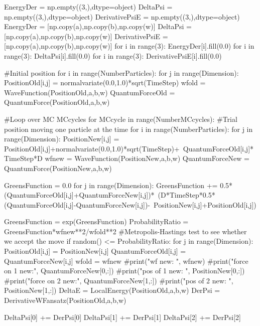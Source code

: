 \documentclass[%
oneside,                 %
final,                   %
10pt]{article}
\begin{document}
    EnergyDer = np.empty((3,),dtype=object)
    DeltaPsi = np.empty((3,),dtype=object)
    DerivativePsiE = np.empty((3,),dtype=object)
    EnergyDer = [np.copy(a),np.copy(b),np.copy(w)]
    DeltaPsi = [np.copy(a),np.copy(b),np.copy(w)]
    DerivativePsiE = [np.copy(a),np.copy(b),np.copy(w)]
    for i in range(3): EnergyDer[i].fill(0.0)
    for i in range(3): DeltaPsi[i].fill(0.0)
    for i in range(3): DerivativePsiE[i].fill(0.0)

    
    #Initial position
    for i in range(NumberParticles):
        for j in range(Dimension):
            PositionOld[i,j] = normalvariate(0.0,1.0)*sqrt(TimeStep)
    wfold = WaveFunction(PositionOld,a,b,w)
    QuantumForceOld = QuantumForce(PositionOld,a,b,w)

    #Loop over MC MCcycles
    for MCcycle in range(NumberMCcycles):
        #Trial position moving one particle at the time
        for i in range(NumberParticles):
            for j in range(Dimension):
                PositionNew[i,j] = PositionOld[i,j]+normalvariate(0.0,1.0)*sqrt(TimeStep)+\
                                       QuantumForceOld[i,j]*TimeStep*D
            wfnew = WaveFunction(PositionNew,a,b,w)
            QuantumForceNew = QuantumForce(PositionNew,a,b,w)
            
            GreensFunction = 0.0
            for j in range(Dimension):
                GreensFunction += 0.5*(QuantumForceOld[i,j]+QuantumForceNew[i,j])*\
                                      (D*TimeStep*0.5*(QuantumForceOld[i,j]-QuantumForceNew[i,j])-\
                                      PositionNew[i,j]+PositionOld[i,j])
      
            GreensFunction = exp(GreensFunction)
            ProbabilityRatio = GreensFunction*wfnew**2/wfold**2
            #Metropolis-Hastings test to see whether we accept the move
            if random() <= ProbabilityRatio:
                for j in range(Dimension):
                    PositionOld[i,j] = PositionNew[i,j]
                    QuantumForceOld[i,j] = QuantumForceNew[i,j]
                wfold = wfnew
        #print("wf new:        ", wfnew)
        #print("force on 1 new:", QuantumForceNew[0,:])
        #print("pos of 1 new:  ", PositionNew[0,:])
        #print("force on 2 new:", QuantumForceNew[1,:])
        #print("pos of 2 new:  ", PositionNew[1,:])
        DeltaE = LocalEnergy(PositionOld,a,b,w)
        DerPsi = DerivativeWFansatz(PositionOld,a,b,w)
        
        DeltaPsi[0] += DerPsi[0]
        DeltaPsi[1] += DerPsi[1]
        DeltaPsi[2] += DerPsi[2]
        
\end{document}

